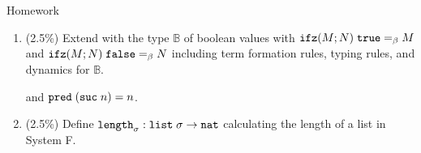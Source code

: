 \begin{frame}{Homework}
  \begin{enumerate}
    \item (2.5\%) Extend {\PCF} with the type $\mathbb{B}$ of boolean values with
      $\mathtt{ifz}(M; N)\;\mathtt{true} =_\beta M$ and $\mathtt{ifz}(M; N)\;\mathtt{false}
      =_\beta N$ including term formation rules, typing rules, and dynamics for
      $\mathbb{B}$.

      and $\mathtt{pred}\;(\mathtt{suc}\;n) = n$.


    \item (2.5\%) Define $\mathtt{length}_\sigma : \mathtt{list}\;\sigma \to \mathtt{nat}$ calculating the length of a list in System F.
    
  \end{enumerate}
  
\end{frame}

%
% 


